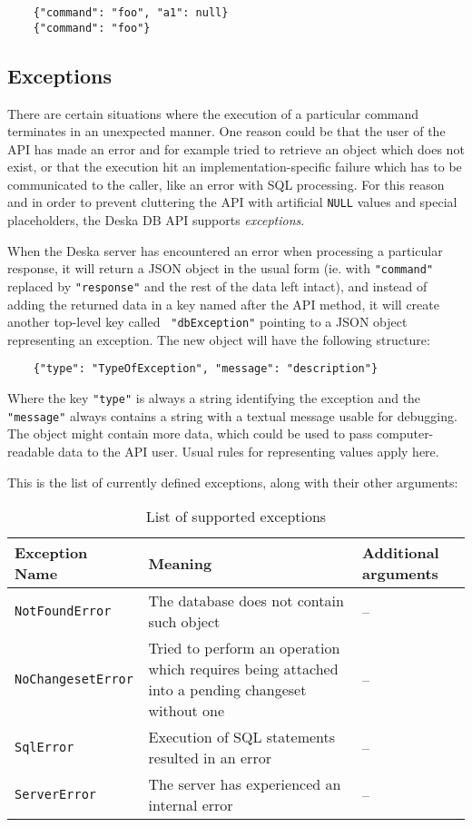 \documentclass{article}
\begin{document}
\begin{lstlisting}
    {"command": "foo", "a1": null}
    {"command": "foo"}
\end{lstlisting}

\subsection{Exceptions}

There are certain situations where the execution of a particular command terminates in an unexpected manner.  One reason
could be that the user of the API has made an error and for example tried to retrieve an object which does not exist, or
that the execution hit an implementation-specific failure which has to be communicated to the caller, like an error with
SQL processing.  For this reason and in order to prevent cluttering the API with artificial {\tt NULL} values and
special placeholders, the Deska DB API supports {\em exceptions}.

When the Deska server has encountered an error when processing a particular response, it will return a JSON object in
the usual form (ie. with {\tt "command"} replaced by {\tt "response"} and the rest of the data left intact), and instead
of adding the returned data in a key named after the API method, it will create another top-level key called {\tt
"dbException"} pointing to a JSON object representing an exception.  The new object will have the following structure:

\begin{lstlisting}
    {"type": "TypeOfException", "message": "description"}
\end{lstlisting}

Where the key {\tt "type"} is always a string identifying the exception and the {\tt "message"} always contains a string
with a textual message usable for debugging.  The object might contain more data, which could be used to pass
computer-readable data to the API user.  Usual rules for representing values apply here.

This is the list of currently defined exceptions, along with their other arguments:

\begin{longtable}{ p{36mm} p{70mm} p{40mm} }
    \caption{List of supported exceptions} \\
    Exception Name & Meaning & Additional arguments \\
    \hline
    \endhead
    {\tt NotFoundError} & The database does not contain such object & -- \\
    {\tt NoChangesetError} & Tried to perform an operation which requires being attached into a pending changeset
        without one & -- \\
    {\tt SqlError} & Execution of SQL statements resulted in an error & -- \\
    {\tt ServerError} & The server has experienced an internal error & -- \\
\end{longtable}
\end{document}

